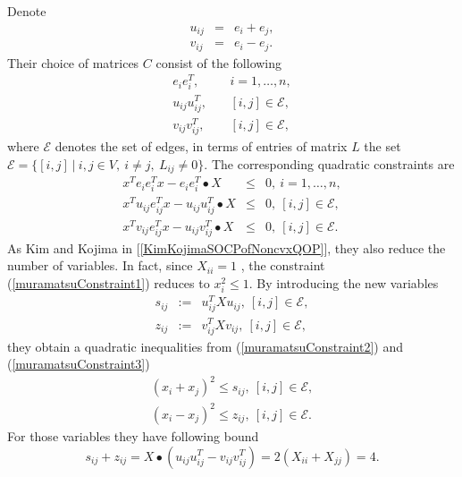 \documentclass[12pt]{book}
\theoremstyle{definition}
\begin{document}
Denote 
\begin{eqnarray*}
u_{ij} &=& e_i + e_j, \\
v_{ij} &=& e_i - e_j.
\end{eqnarray*}
Their choice of matrices $C$ consist of the following 
\begin{eqnarray}
e_ie_i^T, &\ & i = 1,\dots,n, \\
u_{ij}u_{ij}^T, &\ & [i,j]\in \mathcal{E}, \\
v_{ij}v_{ij}^T, &\ & [i,j]\in \mathcal{E},
\end{eqnarray}
where $\mathcal{E}$ denotes the set of edges, in terms of entries of matrix $L$ the set $\mathcal{E} = \{[i,j] \ \vert \ i,j\in V,\ i\neq j, \ L_{ij}\neq 0\}$.
The corresponding quadratic constraints are 
\begin{eqnarray}
\label{muramatsuConstraint1}
x^Te_ie_i^Tx - e_ie_i^T\bullet X &\leq & 0, \ i = 1,\dots,n,\\ 
\label{muramatsuConstraint2}
x^Tu_{ij}e_{ij}^Tx - u_{ij}u_{ij}^T\bullet X &\leq & 0, \ [i,j]\in \mathcal{E},\\ 
\label{muramatsuConstraint3}
x^Tv_{ij}e_{ij}^Tx - u_{ij}v_{ij}^T\bullet X &\leq & 0, \ [i,j]\in \mathcal{E}. 
\end{eqnarray}
As Kim and Kojima in [\ref{KimKojimaSOCPofNoncvxQOP}], they also reduce the number of variables. In fact, since $X_{ii} = 1$ , the constraint (\ref{muramatsuConstraint1}) reduces to $x_i^2 \leq 1$.
By introducing the new variables 
\begin{eqnarray}
s_{ij} &:= & u_{ij}^TXu_{ij},\ [i,j]\in \mathcal{E}, \\ 
z_{ij} &:= & v_{ij}^TXv_{ij},\ [i,j]\in \mathcal{E}, 
\end{eqnarray}
they obtain a quadratic inequalities from (\ref{muramatsuConstraint2}) and (\ref{muramatsuConstraint3})
\begin{eqnarray}
(x_i + x_j)^2 \leq s_{ij}, \ [i,j]\in \mathcal{E}, \\
(x_i - x_j)^2 \leq z_{ij}, \ [i,j]\in \mathcal{E}. 
\end{eqnarray}
For those variables they have following bound
\begin{equation}
s_{ij} + z_{ij} = X\bullet(u_{ij}u_{ij}^T - v_{ij}v_{ij}^T) = 2(X_{ii} + X_{jj}) = 4.
\end{equation}
\end{document}
